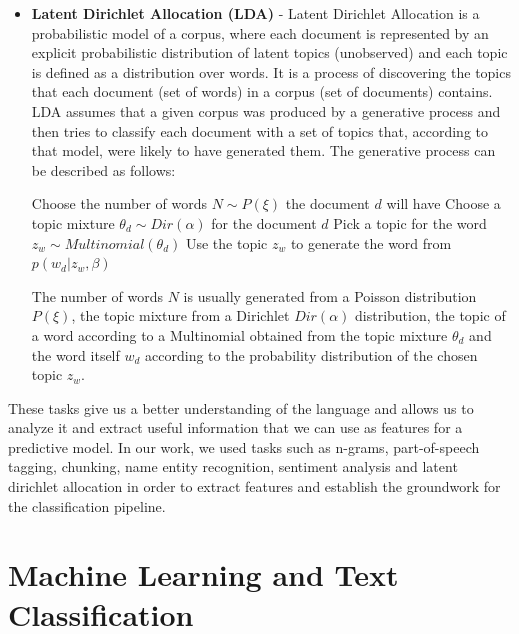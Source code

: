 \begin{itemize}
        \item \textbf{Latent Dirichlet Allocation (LDA)} - Latent Dirichlet Allocation is a probabilistic model of a corpus,  where each document is represented by an explicit probabilistic distribution of latent topics (unobserved) and each topic is defined as a distribution over words. It is a process of discovering the topics that each document (set of words) in a corpus (set of documents) contains. LDA assumes that a given corpus was produced by a generative process and then tries to classify each document with a set of topics that, according to that model, were likely to have generated them. The generative process can be described as follows\citep{Blei2003latentdirichlet}:

\begin{algorithmic}
    \State Choose the number of words $N \sim P(\xi)$ the document $d$ will have
    \State Choose a topic mixture $\theta_d \sim Dir(\alpha)$ for the document $d$
    	\State Pick a topic for the word $z_w \sim Multinomial(\theta_d)$
        \State Use the topic $z_w$ to generate the word from $p(w_d | z_w,\beta)$
    \EndFor
    \EndFor
\end{algorithmic}

The number of words $N$ is usually generated from a Poisson distribution $P(\xi)$, the topic mixture from a Dirichlet $Dir(\alpha)$ distribution, the topic of a word according to a Multinomial obtained from the topic mixture $\theta_d$ and the word itself $w_d$ according to the probability distribution of the chosen topic $z_w$.
  
\end{itemize}

These tasks give us a better understanding of the language and allows us to analyze it and extract useful information that we can use as features for a predictive model. In our work, we used tasks such as n-grams, part-of-speech tagging, chunking, name entity recognition, sentiment analysis and latent dirichlet allocation in order to extract features and establish the groundwork for the classification pipeline. 

\section{Machine Learning and Text Classification}

